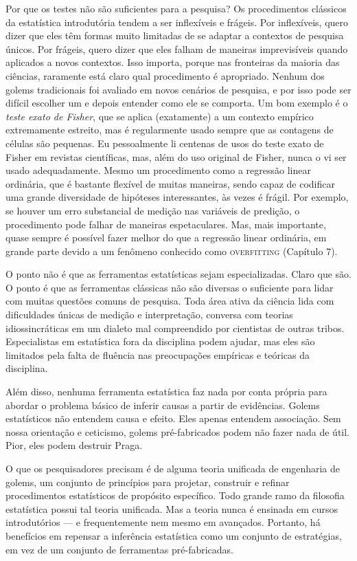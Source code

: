 Por que os testes não são suficientes para a pesquisa? Os procedimentos clássicos da estatística introdutória tendem a ser inflexíveis e frágeis. Por inflexíveis, quero dizer que eles têm formas muito limitadas de se adaptar a contextos de pesquisa únicos. Por frágeis, quero dizer que eles falham de maneiras imprevisíveis quando aplicados a novos contextos. Isso importa, porque nas fronteiras da maioria das ciências, raramente está claro qual procedimento é apropriado. Nenhum dos golems tradicionais foi avaliado em novos cenários de pesquisa, e por isso pode ser difícil escolher um e depois entender como ele se comporta. Um bom exemplo é o \textit{teste exato de Fisher}, que se aplica (exatamente) a um contexto empírico extremamente estreito, mas é regularmente usado sempre que as contagens de células são pequenas. Eu pessoalmente li centenas de usos do teste exato de Fisher em revistas científicas, mas, além do uso original de Fisher, nunca o vi ser usado adequadamente. Mesmo um procedimento como a regressão linear ordinária, que é bastante flexível de muitas maneiras, sendo capaz de codificar uma grande diversidade de hipóteses interessantes, às vezes é frágil. Por exemplo, se houver um erro substancial de medição nas variáveis de predição, o procedimento pode falhar de maneiras espetaculares. Mas, mais importante, quase sempre é possível fazer melhor do que a regressão linear ordinária, em grande parte devido a um fenômeno conhecido como \textsc{overfitting} (Capítulo 7).

O ponto não é que as ferramentas estatísticas sejam especializadas. Claro que são. O ponto é que as ferramentas clássicas não são diversas o suficiente para lidar com muitas questões comuns de pesquisa. Toda área ativa da ciência lida com dificuldades únicas de medição e interpretação, conversa com teorias idiossincráticas em um dialeto mal compreendido por cientistas de outras tribos. Especialistas em estatística fora da disciplina podem ajudar, mas eles são limitados pela falta de fluência nas preocupações empíricas e teóricas da disciplina.

Além disso, nenhuma ferramenta estatística faz nada por conta própria para abordar o problema básico de inferir causas a partir de evidências. Golems estatísticos não entendem causa e efeito. Eles apenas entendem associação. Sem nossa orientação e ceticismo, golems pré-fabricados podem não fazer nada de útil. Pior, eles podem destruir Praga.

O que os pesquisadores precisam é de alguma teoria unificada de engenharia de golems, um conjunto de princípios para projetar, construir e refinar procedimentos estatísticos de propósito específico. Todo grande ramo da filosofia estatística possui tal teoria unificada. Mas a teoria nunca é ensinada em cursos introdutórios — e frequentemente nem mesmo em avançados. Portanto, há benefícios em repensar a inferência estatística como um conjunto de estratégias, em vez de um conjunto de ferramentas pré-fabricadas.